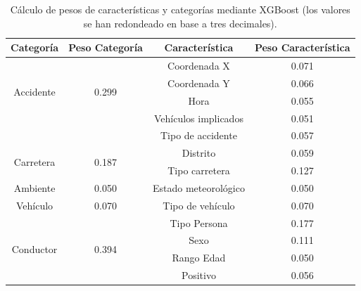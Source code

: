   \begin{table}[H]
    \small
    \centering
    \begin{tabular}{ |c|c|c|c| }
         \hline
         \textbf{Categoría} & \textbf{Peso Categoría} & \textbf{Característica} & \textbf{Peso Característica}\\

         \hline
         \multirow{4}{*}{Accidente}   & \multirow{4}{*}{0.299}        & Coordenada X          & 0.071\\
                                      &                               & Coordenada Y          & 0.066\\
                                      &                               & Hora                  & 0.055\\
                                      &                               & Vehículos implicados  & 0.051\\
                                      &                               & Tipo de accidente     & 0.057\\

         \hline
         \multirow{2}{*}{Carretera}   & \multirow{2}{*}{0.187}        & Distrito              & 0.059\\      
                                      &                               & Tipo carretera        & 0.127\\

         \hline
         \multirow{1}{*}{Ambiente}    & \multirow{1}{*}{0.050}        & Estado meteorológico  & 0.050\\

         \hline
         \multirow{1}{*}{Vehículo}    & \multirow{1}{*}{0.070}        & Tipo de vehículo      & 0.070\\


         \hline
         \multirow{4}{*}{Conductor}   & \multirow{4}{*}{0.394}        & Tipo Persona          & 0.177\\
                                      &                               & Sexo                  & 0.111\\
                                      &                               & Rango Edad            & 0.050\\
                                      &                               & Positivo              & 0.056\\
         \hline

    \end{tabular}

    \caption{Cálculo de pesos de características y categorías mediante XGBoost (los valores se han redondeado en base a tres decimales).}
    \label{PesosFinalesCaracteristicas}
  \end{table}


